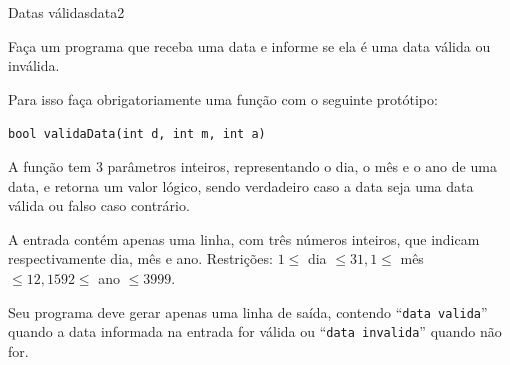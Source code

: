\documentclass[12pt,a4paper,oneside]{article}
\begin{document}
\begin{problem}{Datas válidas}{data}{2}

Faça um programa que receba uma data e informe se ela é uma data válida ou inválida.

Para isso faça obrigatoriamente uma função com o seguinte protótipo:

\texttt{\textcolor{Mulberry}{bool} validaData(\textcolor{Mulberry}{int} d, \textcolor{Mulberry}{int} m, \textcolor{Mulberry}{int} a)}

A função tem 3 parâmetros inteiros, representando o dia, o mês e o ano de uma data, e retorna um valor lógico, sendo verdadeiro caso a data seja uma data válida ou falso caso contrário.


%

\InputFile

A entrada contém apenas uma linha, com três números inteiros, que indicam respectivamente dia, mês e ano. Restrições: $1 \leq$ dia $\leq 31, 1 \leq$ mês $\leq 12, 1592 \leq$ ano $\leq 3999$.

\OutputFile

Seu programa deve gerar apenas uma linha de saída, contendo ``\texttt{data valida}'' quando a data informada na entrada for válida ou ``\texttt{data invalida}'' quando não for. 


\Example

\begin{example}
%
\end{example}

\begin{example}
%
\end{example}

\begin{example}
%
\end{example}

\begin{example}
%
\end{example}

\begin{example}
%
\end{example}




\end{problem}
\end{document}
